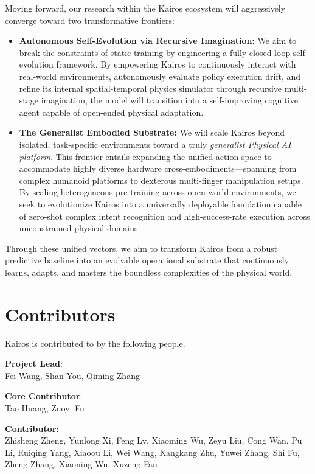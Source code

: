 \documentclass{llmxive}
\providecommand{\beginappendix}{  \appendix  \section*{{\titlefont\sffamily\themeblue{Appendix}}}  \addcontentsline{toc}{section}{Appendix}  \setcounter{section}{1}  \renewcommand{\thesubsection}{\Alph{section}.\arabic{subsection}}}
\begin{document}
Moving forward, our research within the Kairos ecosystem will aggressively converge toward two transformative frontiers:
\begin{itemize}
    \item \textbf{Autonomous Self-Evolution via Recursive Imagination:} We aim to break the constraints of static training by engineering a fully closed-loop self-evolution framework. By empowering Kairos to continuously interact with real-world environments, autonomously evaluate policy execution drift, and refine its internal spatial-temporal physics simulator through recursive multi-stage imagination, the model will transition into a self-improving cognitive agent capable of open-ended physical adaptation.
    \item \textbf{The Generalist Embodied Substrate:} We will scale Kairos beyond isolated, task-specific environments toward a truly \textit{generalist Physical AI platform}. This frontier entails expanding the unified action space to accommodate highly diverse hardware cross-embodiments—spanning from complex humanoid platforms to dexterous multi-finger manipulation setups. By scaling heterogeneous pre-training across open-world environments, we seek to evolutionize Kairos into a universally deployable foundation capable of zero-shot complex intent recognition and high-success-rate execution across unconstrained physical domains.
\end{itemize}
Through these unified vectors, we aim to transform Kairos from a robust predictive baseline into an evolvable operational substrate that continuously learns, adapts, and masters the boundless complexities of the physical world.









\beginappendix
\setcounter{section}{0} %

\section{Contributors}

Kairos is contributed to by the following people.


\textbf{Project Lead}: \\
Fei Wang, Shan You, Qiming Zhang

\textbf{Core Contributor}: \\
Tao Huang, Zuoyi Fu

\textbf{Contributor}: \\
Zhisheng Zheng, Yunlong Xi, Feng Lv, Xiaoming Wu, Zeyu Liu, Cong Wan, Pu Li, Ruiqing Yang, Xiaoou Li, Wei Wang, Kangkang Zhu, Yuwei Zhang, Shi Fu, Zheng Zhang, Xiaoning Wu, Xuzeng Fan
\end{document}
